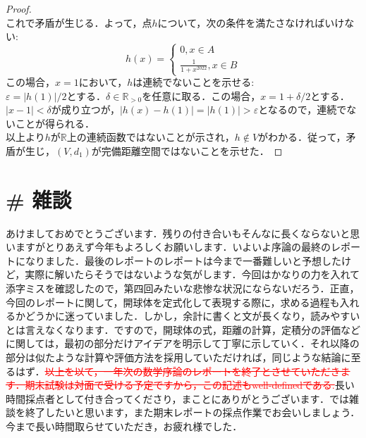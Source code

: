 \documentclass{jreport}
\newcommand{\R}{\mathbb{R}}
\newcommand{\Rp}{\mathbb{R}_{>0}}
\begin{document}
\begin{proof}
$$$$
これで矛盾が生じる．よって，点$h$について，次の条件を満たさなければいけない:
$$
h(x) =
\begin{cases}
        0,x\in A\\
	\frac{1}{1+x^{2022}} ,x \in B
\end{cases}
$$
この場合，$x =1$において，$h$は連続でないことを示せる:\\
$\varepsilon = |h(1)|/2$とする．$\delta \in \Rp$を任意に取る．この場合，$x=1+\delta/2$とする．$|x-1|<\delta$が成り立つが，$|h(x)-h(1)| = |h(1)|>\varepsilon$となるので，連続でないことが得られる．\\
以上より$h$が$\R$上の連続函数ではないことが示され，$h \notin V$がわかる．従って，矛盾が生じ，$(V,d_1)$が完備距離空間ではないことを示せた．
\end{proof}
\newpage
\section{\# 雑談}
あけましておめでとうございます．残りの付き合いもそんなに長くならないと思いますがとりあえず今年もよろしくお願いします．いよいよ序論の最終のレポートになりました．最後のレポートのレポートは今まで一番難しいと予想したけど，実際に解いたらそうではないような気がします．今回はかなりの力を入れて添字ミスを確認したので，第四回みたいな悲惨な状況にならないだろう．正直，今回のレポートに関して，開球体を定式化して表現する際に，求める過程も入れるかどうかに迷っていました．しかし，余計に書くと文が長くなり，読みやすいとは言えなくなります．ですので，開球体の式，距離の計算，定積分の評価などに関しては，最初の部分だけアイデアを明示して丁寧に示していく．それ以降の部分は似たような計算や評価方法を採用していただければ，同じような結論に至るはず．\textcolor{red}{\sout{以上を以て，一年次の数学序論のレポートを終了とさせてい\linebreak ただきます．期末試験は対面で受ける予定ですから，この記述もwell-defined\linebreak である.}}長い時間採点者として付き合ってくださり，まことにありがとうございます．では雑談を終了したいと思います，また期末レポートの採点作業でお会いしましょう．今まで長い時間取らせていただき，お疲れ様でした．
\end{document}
